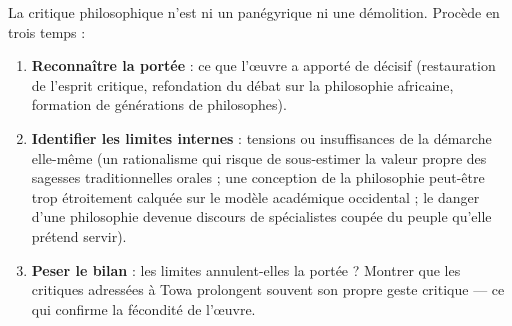 \documentclass[11pt]{article}
\begin{document}
\begin{methode}
La critique philosophique n'est ni un panégyrique ni une démolition. Procède en trois temps :
\begin{enumerate}
\item \textbf{Reconnaître la portée} : ce que l'œuvre a apporté de décisif (restauration de l'esprit critique, refondation du débat sur la philosophie africaine, formation de générations de philosophes).
\item \textbf{Identifier les limites internes} : tensions ou insuffisances de la démarche elle-même (un rationalisme qui risque de sous-estimer la valeur propre des sagesses traditionnelles orales ; une conception de la philosophie peut-être trop étroitement calquée sur le modèle académique occidental ; le danger d'une philosophie devenue discours de spécialistes coupée du peuple qu'elle prétend servir).
\item \textbf{Peser le bilan} : les limites annulent-elles la portée ? Montrer que les critiques adressées à Towa prolongent souvent son propre geste critique — ce qui confirme la fécondité de l'œuvre.
\end{enumerate}
\end{methode}
\end{document}
